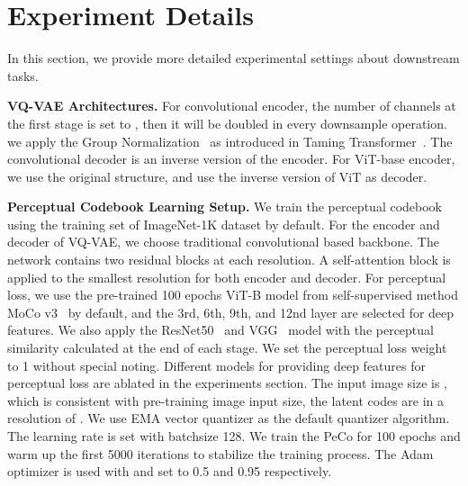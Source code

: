 \documentclass[letterpaper]{article} \usepackage{aaai23}  \usepackage{times}  \usepackage{helvet}  \usepackage{courier}  \usepackage[hyphens]{url}  \usepackage{graphicx} \urlstyle{rm} \def\UrlFont{\rm}  \usepackage{natbib}  \usepackage{caption} \frenchspacing  \setlength{\pdfpagewidth}{8.5in}  \setlength{\pdfpageheight}{11in}  \usepackage{algorithm}
\begin{document}
\begin{table}[h]
\small
\centering {}
\caption{Illustrating the effect of different architectures for training PeCo. 
CNN based encoders and decoders achieve better results than vision Transformer.}
\label{tab:peco_archi}
\end{table}




\section{Experiment Details}
In this section, we provide more detailed experimental settings about downstream tasks.

\noindent \textbf{VQ-VAE Architectures.} For convolutional encoder, the number of channels at the first stage is set to , then it will be doubled in every downsample operation. we apply the Group Normalization~\cite{wu2018group} as introduced in Taming Transformer~\cite{esser2021taming}. The convolutional decoder is an inverse version of the encoder. For ViT-base encoder, we use the original structure, and use the inverse version of ViT as decoder.

\noindent \textbf{Perceptual Codebook Learning Setup.} We train the perceptual codebook using the training set of ImageNet-1K dataset by default. For the encoder and decoder of VQ-VAE, we choose traditional convolutional based backbone.
The network contains two residual blocks at each resolution.
A self-attention block is applied to the smallest resolution for both encoder and decoder. 
For perceptual loss, we use the pre-trained 100 epochs ViT-B model from self-supervised method MoCo v3~\cite{chen2021empirical} by default, and the 3rd, 6th, 9th, and 12nd layer are selected for deep features. 
We also apply the ResNet50~\cite{he2016deep} and VGG~\cite{simonyan2014very} model with the perceptual similarity calculated at the end of each stage. 
We set the perceptual loss weight  to 1 without special noting. Different models for providing deep features for perceptual loss are ablated in the experiments section. 
The input image size is , which is consistent with pre-training image input size, the latent codes are in a resolution of . We use EMA vector quantizer as the default quantizer algorithm. The learning rate is set  with batchsize 128. We train the PeCo for 100 epochs and warm up the first 5000 iterations to stabilize the training process. The Adam~\cite{kingma2014adam} optimizer is used with  and  set to 0.5 and 0.95 respectively.
\end{document}
